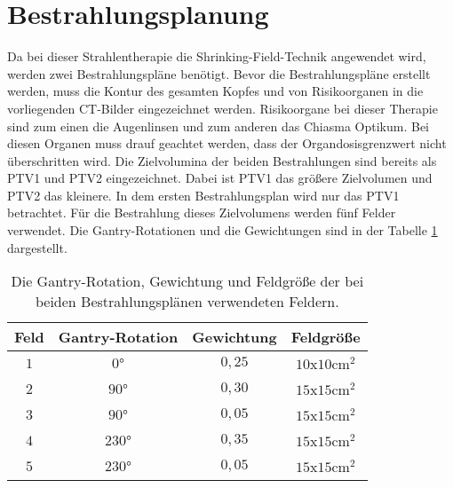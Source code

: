 \section{Bestrahlungsplanung}
\label{sec:Bestrahlungsplanung}

Da bei dieser Strahlentherapie die Shrinking-Field-Technik angewendet wird, werden zwei
Bestrahlungspläne benötigt.
Bevor die Bestrahlungspläne erstellt werden, muss die Kontur des gesamten Kopfes und von
Risikoorganen in die vorliegenden CT-Bilder eingezeichnet werden. Risikoorgane bei dieser
Therapie sind zum einen die Augenlinsen und zum anderen das Chiasma Optikum. Bei diesen
Organen muss drauf geachtet werden, dass der Organdosisgrenzwert nicht überschritten wird.
Die Zielvolumina der beiden Bestrahlungen sind bereits als PTV1 und PTV2 eingezeichnet. Dabei
ist PTV1 das größere Zielvolumen und PTV2 das kleinere.
In dem ersten Bestrahlungsplan wird nur das PTV1 betrachtet. Für die Bestrahlung dieses Zielvolumens werden
fünf Felder verwendet. Die Gantry-Rotationen und die Gewichtungen sind in der Tabelle \ref{tab:Felder1} dargestellt.

\begin{table}
  \centering
  \caption{Die Gantry-Rotation, Gewichtung und Feldgröße der bei beiden Bestrahlungsplänen verwendeten Feldern.}
  \label{tab:Felder1}
  \begin{tabular}{c c c c}
    \toprule
    Feld & Gantry-Rotation & Gewichtung & Feldgröße\\
    \midrule
    $1$ & $0°$ & $0,25$ & $10$x$10 \si{\centi\meter\squared}$ \\
    $2$ & $90°$ & $0,30$ & $15$x$15 \si{\centi\meter\squared}$ \\
    $3$ & $90°$ & $0,05$ & $15$x$15 \si{\centi\meter\squared}$ \\
    $4$ & $230°$ & $0,35$ & $15$x$15 \si{\centi\meter\squared}$ \\
    $5$ & $230°$ & $0,05$ & $15$x$15 \si{\centi\meter\squared}$ \\
    \bottomrule
  \end{tabular}
\end{table}

